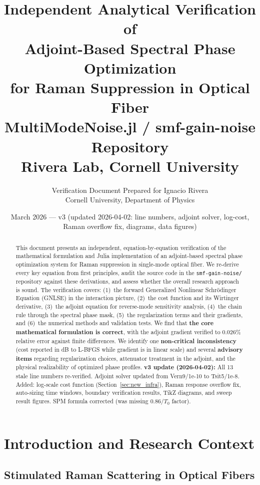 \documentclass[12pt,a4paper]{article}
\title{\textbf{Independent Analytical Verification of\\
Adjoint-Based Spectral Phase Optimization\\
for Raman Suppression in Optical Fiber}\\[12pt]
\large MultiModeNoise.jl / smf-gain-noise Repository\\
Rivera Lab, Cornell University}
\author{Verification Document Prepared for Ignacio Rivera\\
\small Cornell University, Department of Physics}
\date{March 2026 --- v3 (updated 2026-04-02: line numbers, adjoint solver, log-cost, Raman overflow fix, diagrams, data figures)}
\theoremstyle{definition}
\begin{document}
\maketitle
\thispagestyle{empty}

\begin{abstract}
This document presents an independent, equation-by-equation verification of the mathematical formulation and Julia implementation of an adjoint-based spectral phase optimization system for Raman suppression in single-mode optical fiber. We re-derive every key equation from first principles, audit the source code in the \texttt{smf-gain-noise/} repository against these derivations, and assess whether the overall research approach is sound. The verification covers: (1)~the forward Generalized Nonlinear Schr\"odinger Equation (GNLSE) in the interaction picture, (2)~the cost function and its Wirtinger derivative, (3)~the adjoint equation for reverse-mode sensitivity analysis, (4)~the chain rule through the spectral phase mask, (5)~the regularization terms and their gradients, and (6)~the numerical methods and validation tests. We find that \textbf{the core mathematical formulation is correct}, with the adjoint gradient verified to $0.026\%$ relative error against finite differences. We identify one \textbf{non-critical inconsistency} (cost reported in dB to L-BFGS while gradient is in linear scale) and several \textbf{advisory items} regarding regularization choices, attenuator treatment in the adjoint, and the physical realizability of optimized phase profiles.
\medskip\noindent\textbf{v3 update (2026-04-02):} All 13 stale line numbers re-verified. Adjoint solver updated from Vern9/1e-10 to Tsit5/1e-8. Added: log-scale cost function (Section~\ref{sec:new_infra}), Raman response overflow fix, auto-sizing time windows, boundary verification results, TikZ diagrams, and sweep result figures. SPM formula corrected (was missing 0.86/$T_0$ factor).
\end{abstract}

\tableofcontents
\newpage

\section{Introduction and Research Context}
\label{sec:intro}

\subsection{Stimulated Raman Scattering in Optical Fibers}
\end{document}
